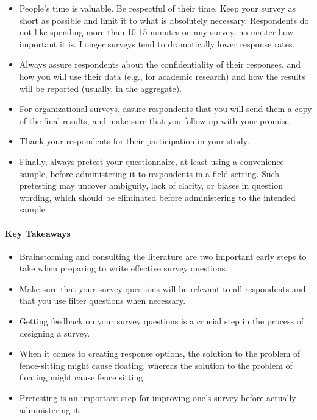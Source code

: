 \begin{itemize}
	\item People’s time is valuable. Be respectful of their time. Keep your survey as short as possible and limit it to what is absolutely necessary. Respondents do not like spending more than 10-15 minutes on any survey, no matter how important it is. Longer surveys tend to dramatically lower response rates.
	\item Always assure respondents about the confidentiality of their responses, and how you will use their data (e.g., for academic research) and how the results will be reported (usually, in the aggregate).
	\item For organizational surveys, assure respondents that you will send them a copy of the final results, and make sure that you follow up with your promise.
	\item Thank your respondents for their participation in your study.
	\item Finally, always pretest your questionnaire, at least using a convenience sample, before administering it to respondents in a field setting. Such pretesting may uncover ambiguity, lack of clarity, or biases in question wording, which should be eliminated before administering to the intended sample.
\end{itemize}

\paragraph{Key Takeaways}

\begin{itemize}
	\setlength{\itemsep}{0pt}
	\setlength{\parskip}{0pt}
	\setlength{\parsep}{0pt}
	
	\item Brainstorming and consulting the literature are two important early steps to take when preparing to write effective survey questions.
	\item Make sure that your survey questions will be relevant to all respondents and that you use filter questions when necessary.
	\item Getting feedback on your survey questions is a crucial step in the process of designing a survey.
	\item When it comes to creating response options, the solution to the problem of fence-sitting might cause floating, whereas the solution to the problem of floating might cause fence sitting.
	\item Pretesting is an important step for improving one’s survey before actually administering it.
	
\end{itemize}

